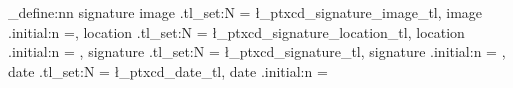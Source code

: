 \usepackage[]{geometry}

\ExplSyntaxOn
\makeatletter

\keys_define:nn {signature} {
	image .tl_set:N = \l_ptxcd_signature_image_tl,
	image .initial:n =,
	location .tl_set:N = \l_ptxcd_signature_location_tl,
	location .initial:n = ,
	signature .tl_set:N = \l_ptxcd_signature_tl,
	signature .initial:n = \@author,
	date .tl_set:N = \l_ptxcd_date_tl,
	date .initial:n = \@date
}


\newcommand*{\SignatureBox}[2][5cm]{\parbox[t]{#1}{\centering
		\rule{\linewidth}{.3pt}\\\makebox[0pt][c]{#2}}
}

\makeatother
\ExplSyntaxOff

\usepackage{anyfontsize}
\usepackage{setspace}

\usepackage{sourcesanspro}


\usepackage{scrlayer-scrpage}
\clearpairofpagestyles
\cfoot[\pagemark]{\pagemark}



\usepackage[ngerman]{babel}
\usepackage{microtype}
\usepackage[babel]{csquotes}

\usepackage[style=apa]{biblatex}
